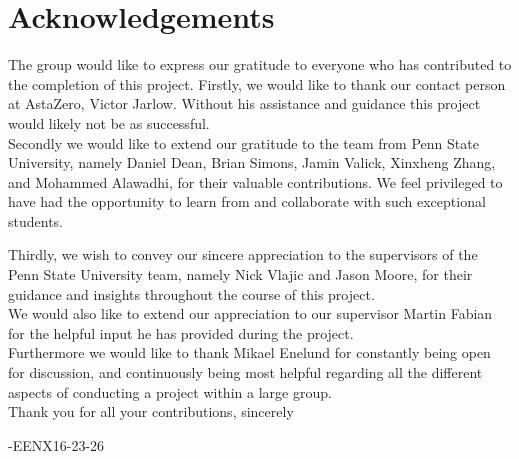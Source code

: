 \thispagestyle{plain}			%
\section*{Acknowledgements}
The group would like to express our gratitude to everyone who has contributed to the completion of this project. Firstly, we would like to thank our contact person at AstaZero, Victor Jarlow. Without his assistance and guidance this project would likely not be as successful. \\

Secondly we would like to extend our gratitude to the team from Penn State University, namely Daniel Dean, Brian Simons, Jamin Valick, Xinxheng Zhang, and Mohammed Alawadhi, for their valuable contributions. We feel privileged to have had the opportunity to learn from and collaborate with such exceptional students.

Thirdly, we wish to convey our sincere appreciation to the supervisors of the Penn State University team, namely Nick Vlajic and Jason Moore, for their guidance and insights throughout the course of this project.
\\

We would also like to extend our appreciation to our supervisor Martin Fabian for the helpful input he has provided during the project. 
\\

Furthermore we would like to thank Mikael Enelund for constantly being open for discussion, and continuously being most helpful regarding all the different aspects of conducting a project within a large group. 
\\

Thank you for all your contributions, sincerely

\vspace{1.5cm}
\hfill
-EENX16-23-26

\thispagestyle{empty}
\mbox{}